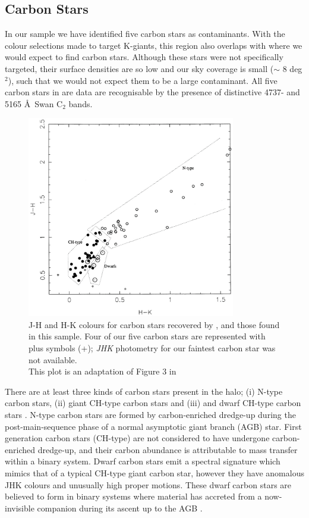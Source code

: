 \documentclass{emulateapj}
\begin{document}
	\subsection{Carbon Stars}
		
		In our sample we have identified five carbon stars as contaminants. With the colour selections made to target K-giants, this region also overlaps with where we would expect to find carbon stars. Although these stars were not specifically targeted, their surface densities are so low \citep[$\approx$ 1 per 50 deg$^2$;][]{Green;et-al_1994} and our sky coverage is small ($\sim$ 8 deg$^2$), such that we would not expect them to be a large contaminant. All five carbon stars in are data are recognisable by the presence of distinctive 4737- and 5165 \AA\, Swan C$_2$ bands.
	
	\begin{figure}[h]
		\centering
		\includegraphics[width=9.1cm]{./figures/carbon.eps}
		\caption{J-H and H-K colours for carbon stars recovered by \citet{Totten;et-al_2000}, and those found in this sample. Four of our five carbon stars are represented with plus symbols (+); \textit{JHK} photometry for our faintest carbon star was not available. \\ This plot is an adaptation of Figure 3 in \citet{Totten;et-al_2000}}
		\label{fig:carbon-colours}
	\end{figure}
		
	There are at least three kinds of carbon stars present in the halo; (i) N-type carbon stars, (ii) giant CH-type carbon stars and (iii) and dwarf CH-type carbon stars \citep{Totten;Irwin_1998}. N-type carbon stars are formed by carbon-enriched dredge-up during the post-main-sequence phase of a normal asymptotic giant branch (AGB) star. First generation carbon stars (CH-type) are not considered to have undergone carbon-enriched dredge-up, and their carbon abundance is attributable to mass transfer within a binary system. Dwarf carbon stars emit a spectral signature which mimics that of a typical CH-type giant carbon star, however they have anomalous JHK colours \citep{Green;et-al_1992} and unusually high proper motions. These dwarf carbon stars are believed to form in binary systems where material has accreted from a now-invisible companion during its ascent up to the AGB \citep{Dahn;et-al_1977}.
	
\end{document}
